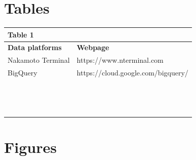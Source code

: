 \documentclass[english,12pt]{article}
\begin{document}
\section{Tables}
\begin{center}
\begin{tabular}{  p{5cm}  |  p{13cm} }
\hline
Table 1 & \textbf{}\\  \hline
  \textbf{Data platforms} & \textbf{Webpage}\\  \hline
        Nakamoto Terminal & https://www.nterminal.com \\ \hline
        BigQuery & https://cloud.google.com/bigquery/ \\ \hline
         & \\ \hline
         & \\ \hline
         & \\ \hline        
         & \\ \hline
         & \\ \hline 
         & \\ \hline        
         & \\ \hline
         & \\ \hline
         & \\ \hline
         & \\ \hline
         & \\ \hline
         & \\ \hline
         & \\ \hline
         & \\ \hline
        
\bottomrule
\end{tabular}
\end{center}


\newpage

\section{Figures}
\end{document}
